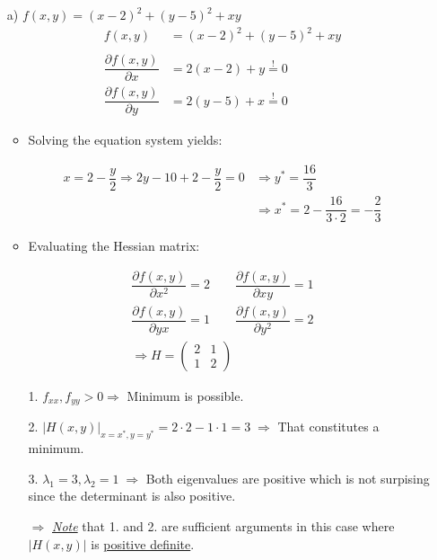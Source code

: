 \documentclass[12pt,a4paper]{article}
\begin{document}
\begin{itemize}
    \item[a)] $f(x,y) = (x -2)^2 + (y -5)^2 + xy$
    \begin{align*}
      f(x,y) & = (x -2)^2 + (y - 5)^2 + xy\\
      & \\
      \dfrac{\partial f(x,y)}{\partial x} & = 2(x -2) + y \overset{!}{=} 0 \\
      \dfrac{\partial f(x,y)}{\partial y} & = 2(y -5) + x \overset{!}{=} 0 
    \end{align*}
    \begin{itemize}
      \item Solving the equation system yields:
    \end{itemize}
    \begin{align*}
      x = 2 -\dfrac{y}{2} \Rightarrow 2y - 10 + 2 - \dfrac{y}{2} = 0 &\Rightarrow y^{*} = \dfrac{16}{3} \\
      &\Rightarrow x^{*} = 2 -\dfrac{16}{3 \cdot 2} = - \dfrac{2}{3}
    \end{align*}
    \begin{itemize}
      \item Evaluating the Hessian matrix:
    \end{itemize}
    \begin{align*}
      \dfrac{\partial f(x,y)}{\partial x^2} = 2 \qquad  \dfrac{\partial f(x,y)}{\partial xy} = 1 \\
      \dfrac{\partial f(x,y)}{\partial yx} = 1  \qquad  \dfrac{\partial f(x,y)}{\partial y^2} = 2\\
      \Rightarrow H = 
      \begin{pmatrix}
        2 & 1 \\
        1 & 2
      \end{pmatrix}
    \end{align*}
    \begin{itemize}
      \item[1.] $f_{xx}, f_{yy} > 0 \Rightarrow$ Minimum is possible.
      \item[2.] $\left| H(x,y) \right|_{x = x^{*}, y = y^{*}} = 2 \cdot 2 - 1 \cdot 1 = 3 \; \Rightarrow$ That constitutes a minimum.
      \item[3.] $\lambda_1 = 3, \lambda_2 = 1 \; \Rightarrow$ Both eigenvalues are positive which is not surpising since the determinant is also positive.
      \item[$\Rightarrow$] \underline{\textit{Note}} that 1. and 2. are sufficient arguments in this case where $\left| H(x,y) \right|$ is \underline{positive definite}. 

\end{itemize}
\end{itemize}
\end{document}
